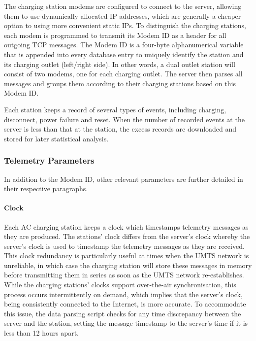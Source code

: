 
The charging station modems are configured to connect to the server, allowing them to use dynamically allocated IP addresses, which are generally a cheaper option to using more convenient static IPs. To distinguish the charging stations, each modem is programmed to transmit its Modem ID as a header for all outgoing TCP messages. The Modem ID is a four-byte alphanumerical variable that is appended into every database entry to uniquely identify the station and its charging outlet (left/right side). In other words, a dual outlet station will consist of two modems, one for each charging outlet. The server then parses all messages and groups them according to their charging stations based on this Modem ID.

Each station keeps a record of several types of events, including charging, disconnect, power failure and reset. When the number of recorded events at the server is less than that at the station, the excess records are downloaded and stored for later statistical analysis. 

\subsubsection{Telemetry Parameters}
In addition to the Modem ID, other relevant parameters are further detailed in their respective paragraphs.

\paragraph{Clock}Each AC charging station keeps a clock which timestamps telemetry messages as they are produced. The stations’ clock differs from the server’s clock whereby the server’s clock is used to timestamp the telemetry messages as they are received. This clock redundancy is particularly useful at times when the UMTS network is unreliable, in which case the charging station will store these messages in memory before transmitting them in series as soon as the UMTS network re-establishes. While the charging stations’ clocks support over-the-air synchronisation, this process occurs intermittently on demand, which implies that the server’s clock, being consistently connected to the Internet, is more accurate. To accommodate this issue, the data parsing script checks for any time discrepancy between the server and the station, setting the message timestamp to the server’s time if it is less than 12 hours apart.

